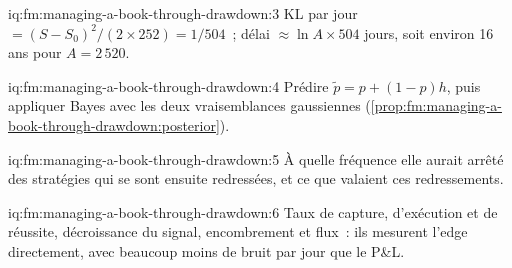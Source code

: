 \begin{solution}{iq:fm:managing-a-book-through-drawdown:3}
KL par jour $=(S-S_0)^2/(2\times252)=1/504$~; délai $\approx\ln A\times504$ jours, soit environ 16 ans pour $A=2\,520$.
\end{solution}

\begin{solution}{iq:fm:managing-a-book-through-drawdown:4}
Prédire $\tilde p=p+(1-p)h$, puis appliquer Bayes avec les deux vraisemblances gaussiennes (\cref{prop:fm:managing-a-book-through-drawdown:posterior}).
\end{solution}

\begin{solution}{iq:fm:managing-a-book-through-drawdown:5}
À quelle fréquence elle aurait arrêté des stratégies qui se sont ensuite redressées, et ce que valaient ces redressements.
\end{solution}

\begin{solution}{iq:fm:managing-a-book-through-drawdown:6}
Taux de capture, d'exécution et de réussite, décroissance du signal, encombrement et flux~: ils mesurent l'edge directement, avec beaucoup moins de bruit par jour que le P\&L.
\end{solution}
